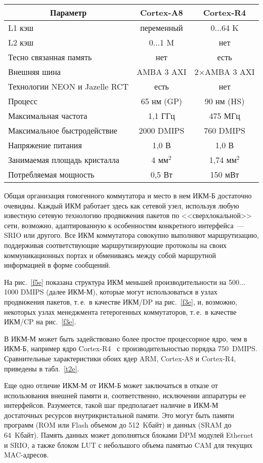 \begin{multicols}{2}
\begin{table*}
\begin{center}
\begin{tabular}{|l|c|c|}
\hline
\multicolumn{1}{|c|}{Параметр}&Cortex-A8&Cortex-R4\\
\hline
L1 кэш&переменный&0$\ldots$64 K\\
L2 кэш&0$\ldots$1 M&нет\\
Тесно связанная память&нет&есть\\
Внешняя шина&AMBA 3 AXI&2\;$\times$\;AMBA 3 AXI\\
Технологии NEON и Jazelle RCT&есть&нет\\
Процесс&65 нм (GP)&90 нм (HS)\\
Максимальная частота&1,1 ГГц&475 МГц\\
Максимальное быстродействие&2000 DMIPS&760 DMIPS\\
Напряжение питания&1,0 В&1,0 В\\
Занимаемая площадь кристалла&4 мм$^2$&1,74 мм$^2$\\
Потребляемая мощность&0,5 Вт&150 мВт\\
\hline
\end{tabular}
\end{center}
\end{table*}

     Общая организация гомогенного коммутатора и место в нем ИКМ-Б достаточно 
очевидны. Каждый ИКМ работает здесь как сетевой узел, используя любую известную 
сетевую технологию продвижения пакетов по <<сверхлокальной>> сети, возможно, 
адаптированную к особенностям конкретного интерфейса~--- SRIO или другого. Все ИКМ 
коммутатора совокупно выполняют маршрутизацию, поддерживая соответствующие 
маршрутизирующие протоколы на своих коммуникационных портах и обмениваясь между 
собой маршрутной информацией в форме сообщений.
     
     На рис.~\ref{f5e} показана структура ИКМ меньшей производительности на 
500$\ldots$1000 DMIPS (далее ИКМ-М), которые могут использоваться в узлах продвижения 
пакетов, т.\,е.\ в качестве ИКМ/DP на рис.~\ref{f3e}, и, возможно, некоторых узлах 
менеджмента гетерогенных коммутаторов, т.\,е.\ в качестве ИКМ/CP на рис.~\ref{f3e}.
     
     В ИКМ-М может быть задействовано более прос\-тое процессорное ядро, чем в ИКМ-Б, 
например ядро Cortex-R4~\cite{17e} с производительностью порядка 750~DMIPS. 
Сравнительные характеристики обоих ядер ARM, Cortex-A8 и Cortex-R4, приведены в 
табл.~\ref{t2e}.
     
     Еще одно отличие ИКМ-М от ИКМ-Б может заключаться в отказе от использования 
внешней памяти и, соответственно, исключении аппаратуры ее интерфейсов. Разумеется, 
такой шаг предполагает наличие в ИКМ-М достаточных ресурсов внутрикристальной 
памяти. Это могут быть памяти программ (ROM или Flash объемом до 512~Kбайт) и данных 
(SRAM до 64~Kбайт). Память данных может дополняться блоками DPM модулей Ethernet и 
SRIO, а также блоком LUT с небольшого объема памятью CAM для текущих MAC-адресов.








\end{multicols}
